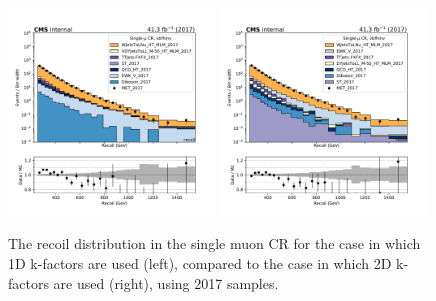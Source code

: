 \begin{figure}
    \begin{center}
        \includegraphics[width=0.49\textwidth]{fig/datamc_1dkfac/cr_1m_vbf/cr_1m_vbf_recoil_losf_2017.pdf}
        \includegraphics[width=0.49\textwidth]{fig/datamc/cr_1m_vbf/cr_1m_vbf_recoil_losf_2017.pdf} 
        \caption{The recoil distribution in the single muon CR for the case in which 1D k-factors are used (left), 
        compared to the case in which 2D k-factors are used (right), using 2017 samples.}
        \label{fig:recoil_2017}
    \end{center}
\end{figure}


